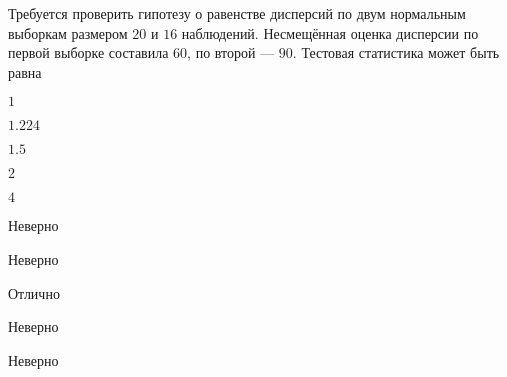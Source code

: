 
\begin{question}
Требуется проверить гипотезу о равенстве дисперсий по двум нормальным
выборкам размером \(20\) и \(16\) наблюдений. Несмещённая оценка
дисперсии по первой выборке составила \(60\), по второй — \(90\).
Тестовая статистика может быть равна
\begin{answerlist}
  \item \(1\)
  \item \(1.224\)
  \item \(1.5\)
  \item \(2\)
  \item \(4\)
\end{answerlist}
\end{question}

\begin{solution}
\begin{answerlist}
  \item Неверно
  \item Неверно
  \item Отлично
  \item Неверно
  \item Неверно
\end{answerlist}
\end{solution}

